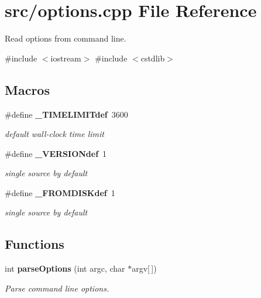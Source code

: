 \section{src/options.cpp File Reference}
\label{options_8cpp}


Read options from command line.  


{\ttfamily \#include $<$iostream$>$}\newline
{\ttfamily \#include $<$cstdlib$>$}\newline
\subsection*{Macros}
\begin{DoxyCompactItemize}
\item 
\#define \textbf{ \+\_\+\+T\+I\+M\+E\+L\+I\+M\+I\+Tdef}~3600
\begin{DoxyCompactList}\small\item\em default wall-\/clock time limit \end{DoxyCompactList}\item 
\#define \textbf{ \+\_\+\+V\+E\+R\+S\+I\+O\+Ndef}~1
\begin{DoxyCompactList}\small\item\em single source by default \end{DoxyCompactList}\item 
\#define \textbf{ \+\_\+\+F\+R\+O\+M\+D\+I\+S\+Kdef}~1
\begin{DoxyCompactList}\small\item\em single source by default \end{DoxyCompactList}\end{DoxyCompactItemize}
\subsection*{Functions}
\begin{DoxyCompactItemize}
\item 
int \textbf{ parse\+Options} (int argc, char $\ast$argv[$\,$])
\begin{DoxyCompactList}\small\item\em Parse command line options. \end{DoxyCompactList}\end{DoxyCompactItemize}
